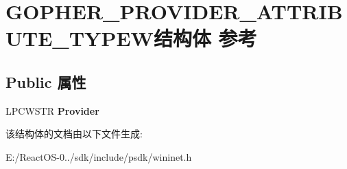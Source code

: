 \hypertarget{struct_g_o_p_h_e_r___p_r_o_v_i_d_e_r___a_t_t_r_i_b_u_t_e___t_y_p_e_w}{}\section{G\+O\+P\+H\+E\+R\+\_\+\+P\+R\+O\+V\+I\+D\+E\+R\+\_\+\+A\+T\+T\+R\+I\+B\+U\+T\+E\+\_\+\+T\+Y\+P\+E\+W结构体 参考}
\label{struct_g_o_p_h_e_r___p_r_o_v_i_d_e_r___a_t_t_r_i_b_u_t_e___t_y_p_e_w}
\subsection*{Public 属性}
\begin{DoxyCompactItemize}
\item 
\mbox{\label{struct_g_o_p_h_e_r___p_r_o_v_i_d_e_r___a_t_t_r_i_b_u_t_e___t_y_p_e_w_acf0f16a3baf456449dfa7f9e7a0a0ff5}} 
L\+P\+C\+W\+S\+TR {\bfseries Provider}
\end{DoxyCompactItemize}


该结构体的文档由以下文件生成\+:\begin{DoxyCompactItemize}
\item 
E\+:/\+React\+O\+S-\/0../sdk/include/psdk/wininet.\+h\end{DoxyCompactItemize}
